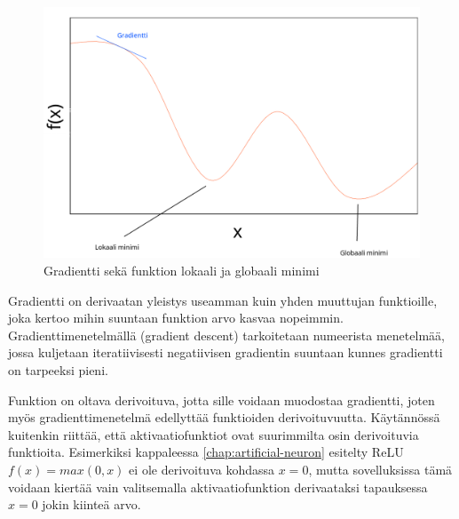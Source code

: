 \documentclass[finnish]{tktltiki2}
\theoremstyle{definition}
\theoremstyle{remark}
\begin{document}
    \begin{figure}[h]
      \centering
      \includegraphics[scale=0.4]{gradient-descent}
      \caption{Gradientti sekä funktion lokaali ja globaali minimi}
      \label{pic:composition}
    \end{figure}

    Gradientti on derivaatan yleistys useamman kuin yhden muuttujan funktioille, joka kertoo mihin suuntaan funktion arvo kasvaa nopeimmin. Gradienttimenetelmällä (gradient descent) tarkoitetaan numeerista menetelmää, jossa kuljetaan iteratiivisesti negatiivisen gradientin suuntaan kunnes gradientti on tarpeeksi pieni. 

    Funktion on oltava derivoituva, jotta sille voidaan muodostaa gradientti, joten myös gradienttimenetelmä edellyttää funktioiden derivoituvuutta. Käytännössä kuitenkin riittää, että aktivaatiofunktiot ovat suurimmilta osin derivoituvia funktioita. 
    Esimerkiksi kappaleessa \ref{chap:artificial-neuron} esitelty ReLU $f(x) = max(0, x)$ ei ole derivoituva kohdassa $x = 0$, mutta sovelluksissa tämä voidaan kiertää vain valitsemalla aktivaatiofunktion derivaataksi tapauksessa $x=0$ jokin kiinteä arvo.
    
\end{document}

